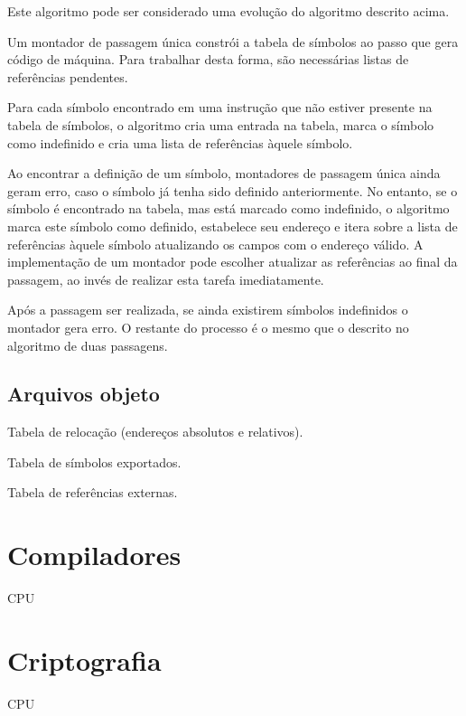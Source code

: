 Este algoritmo pode ser considerado uma evolução do algoritmo descrito acima.

Um montador de passagem única constrói a tabela de símbolos ao passo que gera código de máquina. Para trabalhar desta forma, são necessárias listas de referências pendentes.

Para cada símbolo encontrado em uma instrução que não estiver presente na tabela de símbolos, o algoritmo cria uma entrada na tabela, marca o símbolo como indefinido e cria uma lista de referências àquele símbolo.

Ao encontrar a definição de um símbolo, montadores de passagem única ainda geram erro, caso o símbolo já tenha sido definido anteriormente. No entanto, se o símbolo é encontrado na tabela, mas está marcado como indefinido, o algoritmo marca este símbolo como definido, estabelece seu endereço e itera sobre a lista de referências àquele símbolo atualizando os campos com o endereço válido. A implementação de um montador pode escolher atualizar as referências ao final da passagem, ao invés de realizar esta tarefa imediatamente.

Após a passagem ser realizada, se ainda existirem símbolos indefinidos o montador gera erro. O restante do processo é o mesmo que o descrito no algoritmo de duas passagens.

\subsection{Arquivos objeto}

Tabela de relocação (endereços absolutos e relativos).

Tabela de símbolos exportados.

Tabela de referências externas.

\section{Compiladores}

CPU

\section{Criptografia}

CPU
